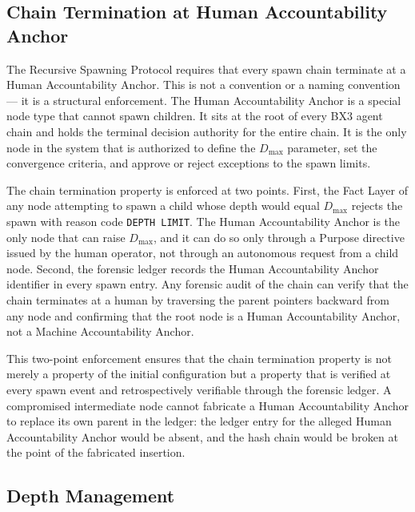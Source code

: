 
\subsection{Chain Termination at Human Accountability Anchor}

The Recursive Spawning Protocol requires that every spawn chain terminate at a Human Accountability Anchor. This is not a convention or a naming convention — it is a structural enforcement. The Human Accountability Anchor is a special node type that cannot spawn children. It sits at the root of every BX3 agent chain and holds the terminal decision authority for the entire chain. It is the only node in the system that is authorized to define the $D_{\max}$ parameter, set the convergence criteria, and approve or reject exceptions to the spawn limits.

The chain termination property is enforced at two points. First, the Fact Layer of any node attempting to spawn a child whose depth would equal $D_{\max}$ rejects the spawn with reason code \texttt{DEPTH\ LIMIT}. The Human Accountability Anchor is the only node that can raise $D_{\max}$, and it can do so only through a Purpose directive issued by the human operator, not through an autonomous request from a child node. Second, the forensic ledger records the Human Accountability Anchor identifier in every spawn entry. Any forensic audit of the chain can verify that the chain terminates at a human by traversing the parent pointers backward from any node and confirming that the root node is a Human Accountability Anchor, not a Machine Accountability Anchor.

This two-point enforcement ensures that the chain termination property is not merely a property of the initial configuration but a property that is verified at every spawn event and retrospectively verifiable through the forensic ledger. A compromised intermediate node cannot fabricate a Human Accountability Anchor to replace its own parent in the ledger: the ledger entry for the alleged Human Accountability Anchor would be absent, and the hash chain would be broken at the point of the fabricated insertion.


\subsection{Depth Management}

